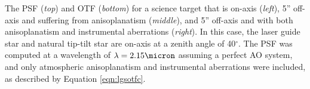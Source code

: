 The PSF ({\em top}) and OTF ({\em bottom}) for a science target that is on-axis ({\em left}), 5'' off-axis and suffering from anisoplanatism ({\em middle}), and 5'' off-axis and with both anisoplanatism and instrumental aberrations ({\em right}). In this case, the laser guide star and natural tip-tilt star are on-axis at a zenith angle of 40$^\circ$. 
The PSF was computed at a wavelength of $\lambda = 2.15 \micron$ assuming a perfect AO system, and only atmospheric anisoplanatism and instrumental aberrations were included, 
as described by Equation \ref{eqn:lgsotfc}.
\label{fig:lgs_atm_inst}
